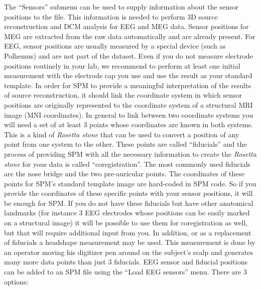 The ``Sensors'' submenu can be used to supply information about the sensor positions to the file. This information is needed to perform 3D
source reconstruction and DCM analysis for EEG and MEG data. Sensor positions for MEG are extracted from the raw data automatically and are already present. For EEG, sensor positions are usually measured by a special device (such as Polhemus) and are not part of the dataset. Even if you do not measure electrode positions routinely in your lab, we recommend to perform at least one initial measurement with the electrode cap you use and use the result as your standard template. In order for SPM to provide a meaningful interpretation of the results of source reconstruction, it should link the coordinate system in which sensor positions are originally represented to the coordinate system of a structural MRI image (MNI coordinates). In general to link between two coordinate systems you will need a set of at least 3 points whose coordinates are known in both systems. This is a kind of \textit{Rosetta stone}  that can be used to convert a position of any point from one system to the other. These points are called ``fiducials'' and the process of providing SPM with all the necessary information to create the \textit{Rosetta stone} for your data is called ``coregistration''. The most commonly used fiducials are the nose bridge and the two pre-auricular points. The coordinates of these points for SPM's standard template image are hard-coded in SPM code. So if you provide the coordinates of these specific points with your sensor positions, it will be enough for SPM. If you do not have these fiducials but have other anatomical landmarks (for instance 3 EEG electrodes whose positions can be easily marked on a structural image) it will be possible to use them for coregistration as well, but that will require additional input from you. In addition, or as a replacement of fiducials a headshape measurement may be used. This measurement is done by an operator moving his digitizer pen around on the subject's scalp and generates many more data points than just 3 fiducials. EEG sensor and fiducial positions can be added to an SPM file using the ``Load EEG sensors'' menu. There are 3 options:

